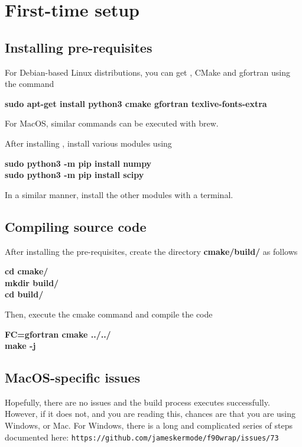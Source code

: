 \section{First-time setup}
\subsection{Installing pre-requisites}
For Debian-based Linux distributions, you can get , CMake and gfortran using the command 
\begin{center}
\textbf{sudo apt-get install python3 cmake gfortran texlive-fonts-extra}
\end{center}

For MacOS, similar commands can be executed with brew. 

After installing , install various modules using 

\begin{center}
\textbf{sudo python3 -m pip install numpy} \\
\textbf{sudo python3 -m pip install scipy} 
\end{center}

In a similar manner, install the other modules with a terminal.


\subsection{Compiling source code}
After installing the pre-requisites, create the directory \textbf{cmake/build/} as follows

\begin{center}
\textbf{cd cmake/} \\
\textbf{mkdir build/}\\
\textbf{cd build/} 
\end{center}

Then, execute the cmake command and compile the code
\begin{center}
\textbf{FC=gfortran cmake ../../} \\
\textbf{make -j} 
\end{center}

\subsection{MacOS-specific issues}

Hopefully, there are no issues and the build process executes successfully. However, if it does not, and you are reading this, chances are that you are using Windows, or Mac. For Windows, there is a long and complicated series of steps documented here:
\texttt{https://github.com/jameskermode/f90wrap/issues/73}

